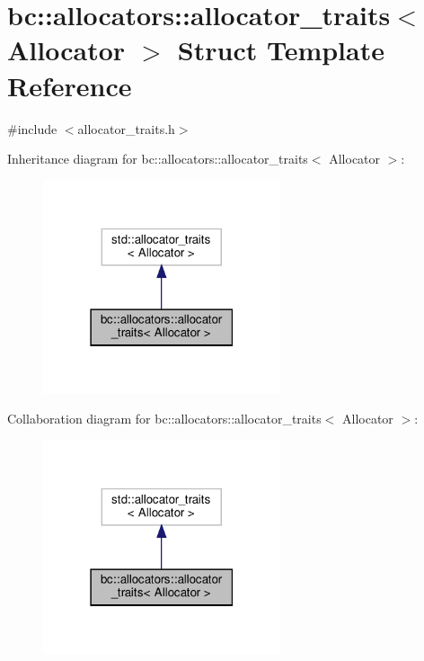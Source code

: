 \hypertarget{structbc_1_1allocators_1_1allocator__traits}{}\section{bc\+:\+:allocators\+:\+:allocator\+\_\+traits$<$ Allocator $>$ Struct Template Reference}
\label{structbc_1_1allocators_1_1allocator__traits}


{\ttfamily \#include $<$allocator\+\_\+traits.\+h$>$}



Inheritance diagram for bc\+:\+:allocators\+:\+:allocator\+\_\+traits$<$ Allocator $>$\+:\nopagebreak
\begin{figure}[H]
\begin{center}
\leavevmode
\includegraphics[width=198pt]{structbc_1_1allocators_1_1allocator__traits__inherit__graph}
\end{center}
\end{figure}


Collaboration diagram for bc\+:\+:allocators\+:\+:allocator\+\_\+traits$<$ Allocator $>$\+:\nopagebreak
\begin{figure}[H]
\begin{center}
\leavevmode
\includegraphics[width=198pt]{structbc_1_1allocators_1_1allocator__traits__coll__graph}
\end{center}
\end{figure}
